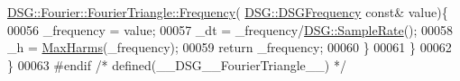\begin{DoxyCode}
      \hyperlink{class_d_s_g_1_1_signal_generator_a4e6b3c43e76e53f8cd337ad699c464cb}{DSG::Fourier::FourierTriangle::Frequency}(
      \hyperlink{namespace_d_s_g_a4315a061386fa1014fda09b15d3a6973}{DSG::DSGFrequency} \textcolor{keyword}{const}& value)\{
00056             \_frequency = value;
00057             \_dt = \_frequency/\hyperlink{namespace_d_s_g_a72df05177db0412c3590070923f62819}{DSG::SampleRate}();
00058             \_h = \hyperlink{namespace_d_s_g_ab5c4eea42ea10b69cfc32afb83ff1d0d}{MaxHarms}(\_frequency);
00059             \textcolor{keywordflow}{return} \_frequency;
00060         \}
00061     \}
00062 \}
00063 \textcolor{preprocessor}{#endif }\textcolor{comment}{/* defined(\_\_DSG\_\_FourierTriangle\_\_) */}\textcolor{preprocessor}{}
\end{DoxyCode}

